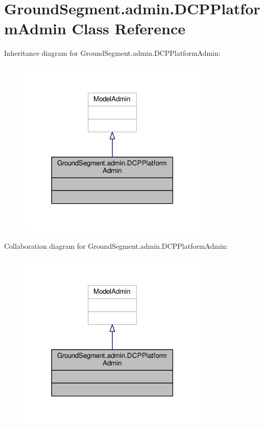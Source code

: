 \hypertarget{class_ground_segment_1_1admin_1_1_d_c_p_platform_admin}{}\section{Ground\+Segment.\+admin.\+D\+C\+P\+Platform\+Admin Class Reference}
\label{class_ground_segment_1_1admin_1_1_d_c_p_platform_admin}


Inheritance diagram for Ground\+Segment.\+admin.\+D\+C\+P\+Platform\+Admin\+:\nopagebreak
\begin{figure}[H]
\begin{center}
\leavevmode
\includegraphics[width=258pt]{class_ground_segment_1_1admin_1_1_d_c_p_platform_admin__inherit__graph}
\end{center}
\end{figure}


Collaboration diagram for Ground\+Segment.\+admin.\+D\+C\+P\+Platform\+Admin\+:\nopagebreak
\begin{figure}[H]
\begin{center}
\leavevmode
\includegraphics[width=258pt]{class_ground_segment_1_1admin_1_1_d_c_p_platform_admin__coll__graph}
\end{center}
\end{figure}


